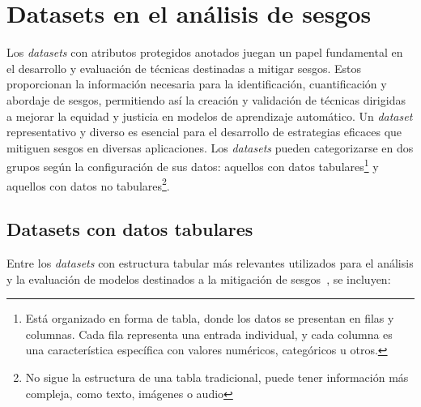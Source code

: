 \section{Datasets en el an\'alisis de sesgos}

    Los \emph{datasets} con atributos protegidos anotados juegan un papel fundamental en el desarrollo y evaluaci\'on de t\'ecnicas destinadas 
    a mitigar sesgos. Estos proporcionan la informaci\'on necesaria para la identificaci\'on, cuantificaci\'on y abordaje de sesgos, 
    permitiendo as\'i la creaci\'on y validaci\'on de t\'ecnicas dirigidas a mejorar la equidad y justicia en modelos de aprendizaje 
    autom\'atico. 
    Un \emph{dataset} representativo y diverso es esencial para el desarrollo de estrategias eficaces que mitiguen sesgos en diversas aplicaciones. 
    Los \emph{datasets} pueden categorizarse en dos grupos seg\'un la configuraci\'on de sus datos: 
    aquellos con datos tabulares\footnote{Est\'a organizado en forma de tabla, donde los datos se presentan en filas y columnas. Cada fila 
    representa una entrada individual, y cada columna es una caracter\'istica espec\'ifica con valores num\'ericos, categ\'oricos u otros.} 
    y aquellos con datos no tabulares\footnote{No sigue la estructura de una tabla tradicional, puede tener informaci\'on m\'as compleja, como 
    texto, im\'agenes o audio}.
    
    \subsection{Datasets con datos tabulares}
    Entre los \emph{datasets} con estructura tabular m\'as relevantes utilizados para el an\'alisis y la evaluaci\'on de modelos destinados 
    a la mitigaci\'on de sesgos~\parencite{calmon2017optimized,wang2023mitigating,compas}, se incluyen:

